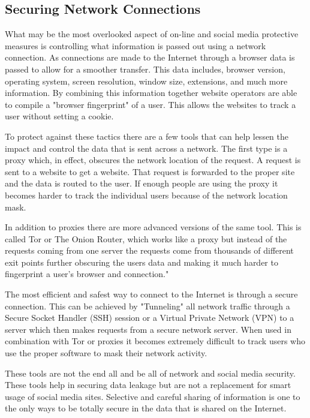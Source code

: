 \subsection{Securing Network Connections} 
What may be the most overlooked aspect of on-line and social media protective
measures is controlling what information is passed out using a network
connection. As connections are made to the Internet through a browser data is
passed to allow for a smoother transfer. This data includes, browser version,
operating system, screen resolution, window size, extensions, and much more
information. By combining this information together website operators are able
to compile a "browser fingerprint" of a user. This allows the websites to track
a user without setting a cookie.

To protect against these tactics there are a few tools that can help lessen the
impact and control the data that is sent across a network. The first type is a
proxy which, in effect, obscures the network location of the request. A request is
sent to a website to get a website. That request is forwarded to the proper site
and the data is routed to the user. If enough people are using the proxy it
becomes harder to track the individual users because of the network location
mask.

In addition to proxies there are more advanced versions of the same tool. This
is called Tor or The Onion Router, which works like a proxy but instead of the
requests coming from one server the requests come from thousands of different
exit points further obscuring the users data and making it much harder to
fingerprint a user's browser and connection."

The most efficient and safest way to connect to the Internet is through a
secure connection. This can be achieved by "Tunneling" all network traffic
through a Secure Socket Handler (SSH) session or a Virtual Private Network
(VPN) to a server which then makes requests from a secure network server. When
used in combination with Tor or proxies it becomes extremely difficult to track users
who use the proper software to mask their network activity.

These tools are not the end all and be all of network and social media security.
These tools help in securing data leakage but are not a replacement for smart
usage of social media sites. Selective and careful sharing of information is one
to the only ways to be totally secure in the data that is shared on the
Internet.%
